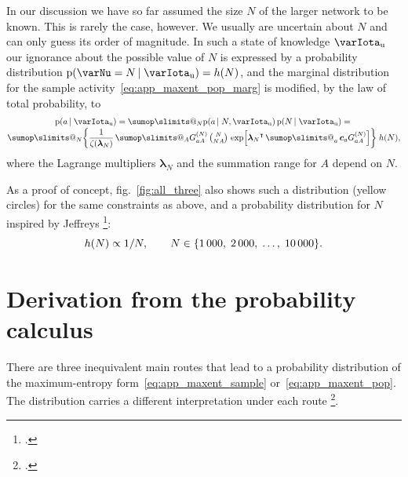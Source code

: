 \documentclass[\ifafour a4paper,12pt,\else a5paper,10pt,\fi%
onecolumn,oneside,article,%
british%
]{memoir}
\makeatletter
\theoremstyle{remark}
\theoremstyle{innote}
\def\sum{\DOTSI\sumop\slimits@}
\newcommand*{\citep}{\footcites}
\DeclarePairedDelimiter\set{\{}{\}}
\newcommand*{\pf}{\mathrm{p}}%
\renewcommand*{\|}[1][]{\nonscript\,#1\vert\nonscript\;\mathopen{}}
\newcommand*{\sect}{\S}%
\newcommand*{\fig}{fig.}%
\newcommand*{\tsum}{\mathop{\textstyle\sum}\nolimits}
\newcommand*{\T}{^\intercal}%
\newcommand*{\ypp}{G}
\newcommand*{\yAv}{A}
\newcommand*{\yav}{a}
\newcommand*{\yNv}{N}
\newcommand*{\yNN}{\varNu}
\newcommand*{\ya}{\yav}%
\newcommand*{\yA}{\yAv}%
\newcommand*{\yHd}{\varIota_\textrm{u}}
\newcommand*{\yg}{\bm{c}}
\newcommand*{\yll}{\bm{\lambda}}
\newcommand*{\yK}{\zeta}
\makeatother
\begin{document}
\bigskip

In our discussion we have so far assumed the size $\yNv$ of the larger
network to be known. This is rarely the case, however. We usually are
uncertain about $\yNv$ and can only guess its order of magnitude. In such a
state of knowledge $\yHd$ our ignorance about the possible value of $\yNv$
is expressed by a probability distribution $\pf(\yNN=\yNv \|\yHd)=h(\yNv)$,
and the marginal distribution for the sample
activity~\eqref{eq:app_maxent_pop_marg} is modified, by the law of total
probability, to
\begin{multline}
  \label{eq:app_maxent_pop_marg_unknown_N}
  \pf(\ya \| \yHd)  =
  \sum_{\yNv} \pf(\ya \| \yNv,\yHd) \,
  \pf(\yNv \|\yHd)
  ={}\\[-\jot]
  \sum_\yNv \biggl\{\frac{1}{\yK(\yll_\yNv)}\, 
  \sum_{\yA} \ypp^{(\yNv)}_{\ya\yA}
\,
  \tbinom{\yNv}{\yNv \yA}\,\exp\Bigl[{\yll_\yNv}\T
  \tsum_{\ya} \yg_{\ya}\ypp^{(\yNv)}_{\ya\yA}\Bigr]\biggr\}
  \;h(\yNv),
\end{multline}
where the Lagrange multipliers $\yll_{\yNv}$ and the summation range for
$\yA$ depend on $\yNv$.

As a proof of concept, \fig~\ref{fig:all_three} also shows such a distribution
(yellow circles) for the same constraints as above, and a probability
distribution for $\yNv$ inspired by Jeffreys
\citep[\sect~4.8]{jeffreys1939_r1983}:
\begin{equation}
  \label{eq:pdf_popsize}
  h(\yNv) \propto 1/\yNv, \qquad
  \yNv \in\set{1\,000,\; 2\,000,\; \dotsc,\;10\,000}.
\end{equation}

\section{Derivation from the probability calculus}
\label{sec:derivation_prob_calculus}

There are three inequivalent main routes that lead to a probability
distribution of the maximum-entropy form~\eqref{eq:app_maxent_sample}
or~\eqref{eq:app_maxent_pop}. The distribution carries a different
interpretation under each route \citep[pp.~52--55,
72--77]{jaynes1979b}[pp.~25--28]{jaynes1982}[\sect~I]{jaynes1982b}{jaynes1986d_r1996}[\sect~11.1]{jaynes1994_r2003}.
\end{document}
